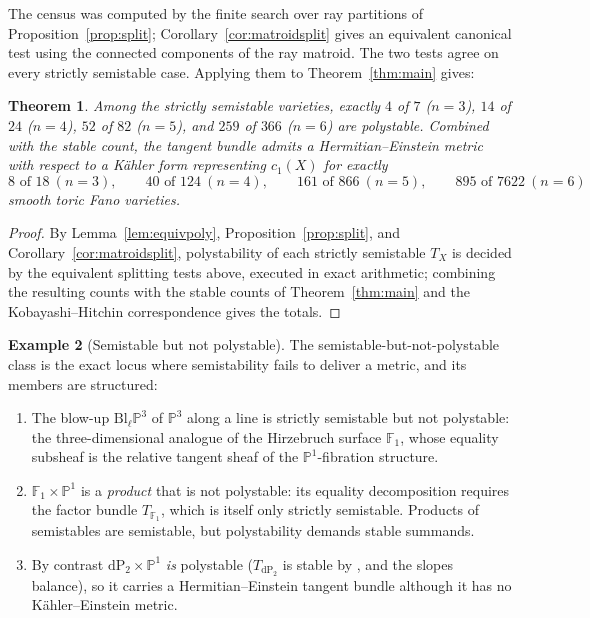 \documentclass[11pt]{amsart}
\newtheorem{theorem}{Theorem}[section]
\theoremstyle{definition}
\newtheorem{example}[theorem]{Example}
\theoremstyle{remark}
\newcommand{\PP}{\mathbb{P}}
\newcommand{\dP}{\mathrm{dP}}
\begin{document}
The census was computed by the finite search over ray partitions of
Proposition~\ref{prop:split}; Corollary~\ref{cor:matroidsplit} gives an
equivalent canonical test using the connected components of the ray matroid.
The two tests agree on every strictly semistable case. Applying them to
Theorem~\ref{thm:main} gives:

\begin{theorem}\label{thm:HE}
Among the strictly semistable varieties, exactly $4$ of $7$ ($n=3$),
$14$ of $24$ ($n=4$), $52$ of $82$ ($n=5$), and $259$ of $366$ ($n=6$) are
polystable. Combined with the stable count, the tangent bundle admits a
Hermitian--Einstein metric with respect to a K\"ahler form representing
$c_1(X)$ for exactly
\[
8 \text{ of } 18 \ (n=3), \qquad
40 \text{ of } 124 \ (n=4), \qquad
161 \text{ of } 866 \ (n=5), \qquad
895 \text{ of } 7622 \ (n=6)
\]
smooth toric Fano varieties.
\end{theorem}

\begin{proof}
By Lemma~\ref{lem:equivpoly}, Proposition~\ref{prop:split}, and
Corollary~\ref{cor:matroidsplit},
polystability of each strictly semistable $T_X$ is decided by the
equivalent splitting tests above, executed in exact arithmetic; combining the
resulting counts with the stable counts of Theorem~\ref{thm:main} and
the Kobayashi--Hitchin correspondence
\cite{Donaldson1985,UhlenbeckYau1986} gives the totals.
\end{proof}

\begin{example}[Semistable but not polystable]
The semistable-but-not-polystable class is the exact locus where
semistability fails to deliver a metric, and its members are structured:
\begin{enumerate}
\item The blow-up $\mathrm{Bl}_\ell \PP^3$ of $\PP^3$ along a line is strictly
semistable but not polystable: the three-dimensional analogue of
the Hirzebruch surface $\mathbb{F}_1$, whose equality subsheaf is the
relative tangent sheaf of the $\PP^1$-fibration structure.
\item $\mathbb{F}_1 \times \PP^1$ is a \emph{product} that is not
polystable:
its equality decomposition requires the factor bundle $T_{\mathbb{F}_1}$,
which
is itself only strictly semistable. Products of semistables are
semistable, but polystability demands stable summands.
\item By contrast $\dP_2 \times \PP^1$ \emph{is} polystable
($T_{\dP_2}$ is stable by \cite{Fahlaoui1989}, and the slopes balance),
so it carries a Hermitian--Einstein tangent bundle although it has no
K\"ahler--Einstein metric.
\end{enumerate}
\end{example}
\end{document}
